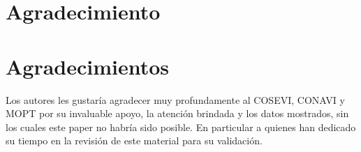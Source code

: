 \documentclass[conference]{IEEEtran}
\begin{document}
\ifCLASSOPTIONcompsoc
  \section*{Agradecimiento}
\else
  \section*{Agradecimientos}
\fi


Los autores les gustar\'ia agradecer muy profundamente al COSEVI, CONAVI y MOPT por su invaluable apoyo, la atenci\'on brindada y los datos mostrados, sin los cuales este paper no habr\'ia sido posible. En particular a quienes han dedicado su tiempo en la revisi\'on de este material para su validaci\'on.%


\ifCLASSOPTIONcaptionsoff
  \newpage
\fi





%
%
%
\end{document}
